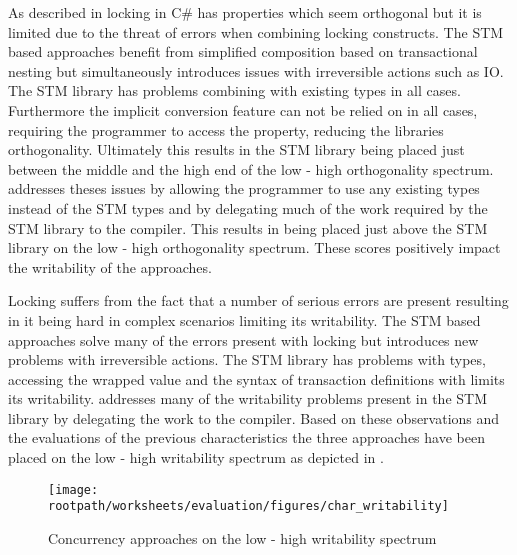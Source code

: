 As described in  locking in C\# has properties which seem orthogonal but it is limited due to the threat of errors when combining locking constructs. The \ac{STM} based approaches benefit from simplified composition based on transactional nesting but simultaneously introduces issues with irreversible actions such as \ac{IO}. The \ac{STM} library has problems combining with existing types in all cases. Furthermore the implicit conversion feature can not be relied on in all cases, requiring the programmer to access the  property, reducing the libraries orthogonality. Ultimately this results in the \ac{STM} library being placed just between the middle and the high end of the low - high orthogonality spectrum. \stmname addresses theses issues by allowing the programmer to use any existing types instead of the \ac{STM} types and by delegating much of the work required by the \ac{STM} library to the compiler. This results in \stmname being placed just above the \ac{STM} library on the  low - high orthogonality spectrum. These scores positively impact the writability of the approaches.

Locking suffers from the fact that a number of serious errors are present resulting in it being hard in complex scenarios limiting its writability. The \ac{STM} based approaches solve many of the errors present with locking but introduces new problems with irreversible actions. The \ac{STM} library has problems with types, accessing the wrapped value and the syntax of transaction definitions with limits its writability. \stmname addresses many of the writability problems present in the \ac{STM} library by delegating the work to the compiler. Based on these observations and the evaluations of the previous characteristics the three approaches have been placed on the low - high writability spectrum as depicted in .

\begin{figure}[htbp]
\centering
 \texttt{[image: \\rootpath/worksheets/evaluation/figures/char\_writability]} 
 \caption{Concurrency approaches on the low - high writability spectrum}
\label{fig:char_tl_writability}
\end{figure}

\worksheetend

